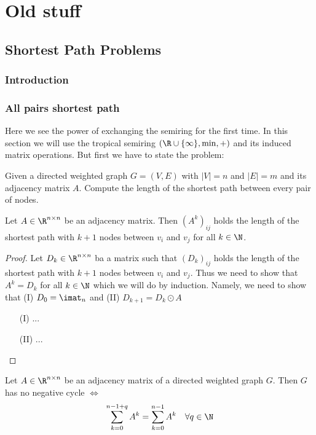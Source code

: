 \chapter{Old stuff}
\section{Shortest Path Problems}
\subsection{Introduction}
\subsection{All pairs shortest path}
Here we see the power of exchanging the semiring for the first time. In this section we will use the tropical semiring $(\R \cup \{\infty\}, \min, +)$ and its induced matrix operations. But first we have to state the problem:
\begin{problem} 
    Given a directed weighted graph $G = (V, E)$ with $|V| = n$ and $|E| = m$ and its adjacency matrix $A$. Compute the length of the shortest path between every pair of nodes.
\end{problem}

\begin{lemma}
    Let $A \in \R^{n \times n}$ be an adjacency matrix. Then $(A^k)_{ij}$ holds the length of the shortest path with $k+1$ nodes between $v_i$ and $v_j$ for all $k \in \N$. 
\end{lemma}
\begin{proof}
    Let $D_k \in \R^{n \times n}$ ba a matrix such that $(D_k)_{ij}$ holds the length of the shortest path with $k+1$ nodes between $v_i$ and $v_j$. Thus we need to show that $A^k = D_k$ for all $k \in \N$ which we will do by induction. Namely, we need to show that (I) $D_0 = \imat_n$ and (II) $D_{k+1} = D_k \odot A$
    \begin{enumerate}
        \item[(I)] ...
        \item[(II)] ...
    \end{enumerate}
\end{proof}

\begin{lemma}
    Let $A \in \R^{n \times n}$ be an adjacency matrix of a directed weighted graph $G$. Then $G$ has no negative cycle $\Leftrightarrow$ 
    $$\sum_{k=0}^{n-1+q} A^k = \sum_{k=0}^{n-1} A^k \quad\forall q \in \N$$
\end{lemma}

